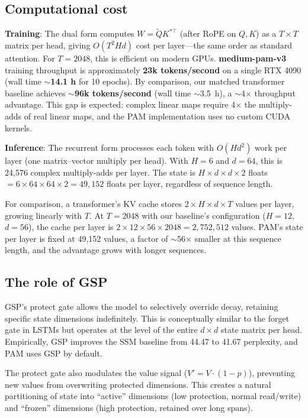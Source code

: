 \documentclass[11pt]{article}
\begin{document}
\subsection{Computational cost}
\textbf{Training}: The dual form computes $W = \tilde{Q} K^{*\top}$ (after RoPE on $Q,K$) as a $T \times T$ matrix per head, giving $O(T^2 H d)$ cost per layer---the same order as standard attention. For $T = 2048$, this is efficient on modern GPUs. \textbf{medium-pam-v3} training throughput is approximately \textbf{23k tokens/second} on a single RTX 4090 (wall time \textbf{$\sim$14.1 h} for 10 epochs). By comparison, our matched transformer baseline achieves $\sim$\textbf{96k tokens/second} (wall time $\sim$3.5~h), a $\sim$4$\times$ throughput advantage. This gap is expected: complex linear maps require 4$\times$ the multiply-adds of real linear maps, and the PAM implementation uses no custom CUDA kernels.

\textbf{Inference}: The recurrent form processes each token with $O(Hd^2)$ work per layer (one matrix--vector multiply per head). With $H = 6$ and $d = 64$, this is 24,576 complex multiply-adds per layer. The state is $H \times d \times d \times 2$ floats $= 6 \times 64 \times 64 \times 2 = 49{,}152$ floats per layer, regardless of sequence length.

For comparison, a transformer's KV cache stores $2 \times H \times d \times T$ values per layer, growing linearly with $T$. At $T = 2048$ with our baseline's configuration ($H{=}12$, $d{=}56$), the cache per layer is $2 \times 12 \times 56 \times 2048 = 2{,}752{,}512$ values. PAM's state per layer is fixed at 49,152 values, a factor of $\sim$56$\times$ smaller at this sequence length, and the advantage grows with longer sequences.

\subsection{The role of GSP}
GSP's protect gate allows the model to selectively override decay, retaining specific state dimensions indefinitely. This is conceptually similar to the forget gate in LSTMs but operates at the level of the entire $d \times d$ state matrix per head. Empirically, GSP improves the SSM baseline from 44.47 to 41.67 perplexity, and PAM uses GSP by default.

The protect gate also modulates the value signal ($V' = V \cdot (1 - p)$), preventing new values from overwriting protected dimensions. This creates a natural partitioning of state into ``active'' dimensions (low protection, normal read/write) and ``frozen'' dimensions (high protection, retained over long spans).
\end{document}
